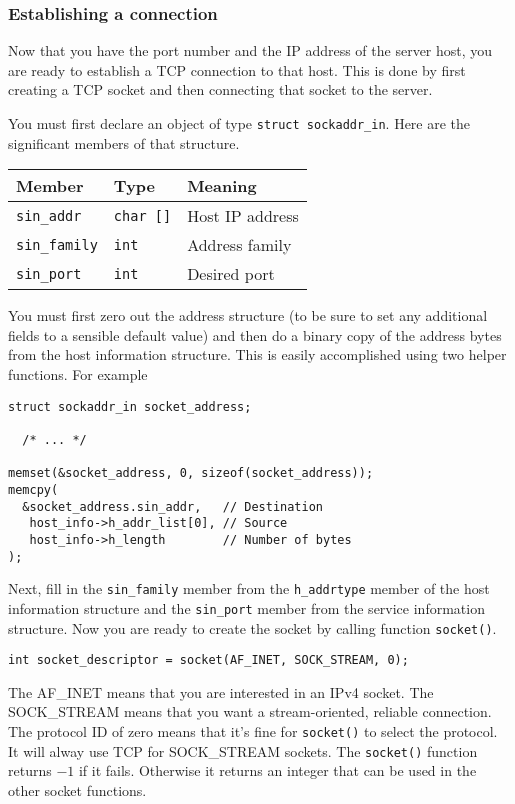 \documentclass{article}
\begin{document}
\subsubsection{Establishing a connection}

Now that you have the port number and the IP address of the server host, you are ready to establish a TCP connection to that host. This is done by first creating a TCP socket and then connecting that socket to the server.

You must first declare an object of type \texttt{struct sockaddr\_in}. Here are the significant members of that structure.

\begin{tabular}{|l|l|l|} \hline
Member               & Type             & Meaning          \\ \hline \hline
\texttt{sin\_addr}   & \texttt{char []} & Host IP address  \\ \hline
\texttt{sin\_family} & \texttt{int}     & Address family   \\ \hline
\texttt{sin\_port}   & \texttt{int}     & Desired port     \\ \hline
\end{tabular}

You must first zero out the address structure (to be sure to set any additional fields to a sensible default value) and then do a binary copy of the address bytes from the host information structure. This is easily accomplished using two helper functions. For example

\begin{verbatim}
struct sockaddr_in socket_address;

  /* ... */

memset(&socket_address, 0, sizeof(socket_address));
memcpy(
  &socket_address.sin_addr,   // Destination
   host_info->h_addr_list[0], // Source
   host_info->h_length        // Number of bytes
);
\end{verbatim}

Next, fill in the \texttt{sin\_family} member from the \texttt{h\_addrtype} member of the host information structure and the \texttt{sin\_port} member from the service information structure. Now you are ready to create the socket by calling function \texttt{socket()}.

\begin{verbatim}
int socket_descriptor = socket(AF_INET, SOCK_STREAM, 0);
\end{verbatim}

The AF\_INET means that you are interested in an IPv4 socket. The SOCK\_\-STREAM means that you want a stream-oriented, reliable connection. The protocol ID of zero means that it's fine for \texttt{socket()} to select the protocol. It will alway use TCP for SOCK\_STREAM sockets. The \texttt{socket()} function returns $-1$ if it fails. Otherwise it returns an integer that can be used in the other socket functions.
\end{document}
